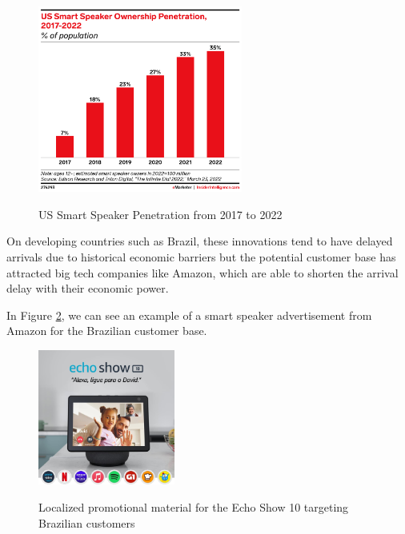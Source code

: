 \begin{figure}[H]
	\centering
	\caption[US Smart Speaker Penetration from 2017 to 2022]{US Smart Speaker Penetration from 2017 to 2022}
	\includegraphics[width=0.6\textwidth]{./images/smartspeaker.png} %
	\label{fig:smartspeaker}
\end{figure}

On developing countries such as Brazil, these innovations tend to
have delayed arrivals due to historical economic barriers but the potential
customer base has attracted big tech companies like Amazon, which are able
to shorten the arrival delay with their economic power.

In Figure \ref{fig:alexabr}, we can see an example of a smart speaker advertisement 
from Amazon for the Brazilian customer base.

\begin{figure}[h!]
	\centering
	\caption[Localized promotional material for the Echo Show 10 targeting Brazilian customers]{Localized promotional material for the Echo Show 10 targeting Brazilian customers}
	\includegraphics[width=0.4\textwidth]{./images/alexabr.jpg} %
    \label{fig:alexabr}
\end{figure}

